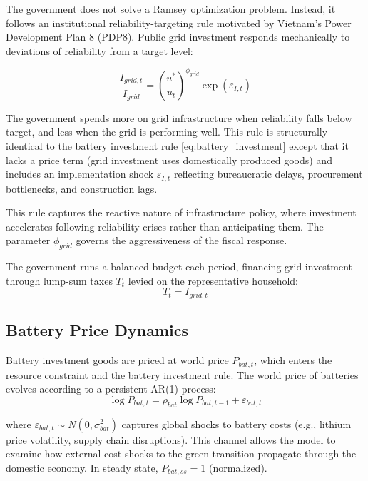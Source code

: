 \documentclass[12pt, a4paper]{article}
\begin{document}
The government does not solve a Ramsey optimization problem. Instead, it follows an institutional reliability-targeting rule motivated by Vietnam's Power Development Plan 8 (PDP8). Public grid investment responds mechanically to deviations of reliability from a target level:

\begin{equation}
\frac{I_{grid,t}}{\bar{I}_{grid}} =
\left(\frac{u^*}{u_t}\right)^{\phi_{grid}}
\exp(\varepsilon_{I,t})
\label{eq:grid_investment_rule}
\end{equation}

The government spends more on grid infrastructure when reliability falls below target, and less when the grid is performing well. This rule is structurally identical to the battery investment rule \eqref{eq:battery_investment} except that it lacks a price term (grid investment uses domestically produced goods) and includes an implementation shock $\varepsilon_{I,t}$ reflecting bureaucratic delays, procurement bottlenecks, and construction lags.

This rule captures the reactive nature of infrastructure policy, where investment accelerates following reliability crises rather than anticipating them. The parameter $\phi_{grid}$ governs the aggressiveness of the fiscal response.

The government runs a balanced budget each period, financing grid investment through lump-sum taxes $T_t$ levied on the representative household:
\begin{equation}
T_t = I_{grid,t}
\label{eq:gov_budget}
\end{equation}

\subsection{Battery Price Dynamics}

Battery investment goods are priced at world price $P_{bat,t}$, which enters the resource constraint and the battery investment rule. The world price of batteries evolves according to a persistent AR(1) process:
\begin{equation}
\log P_{bat,t} = \rho_{bat} \log P_{bat,t-1} + \varepsilon_{bat,t}
\label{eq:battery_price_shock}
\end{equation}

where $\varepsilon_{bat,t} \sim N(0, \sigma^2_{bat})$ captures global shocks to battery costs (e.g., lithium price volatility, supply chain disruptions). This channel allows the model to examine how external cost shocks to the green transition propagate through the domestic economy. In steady state, $P_{bat,ss} = 1$ (normalized).
\end{document}
